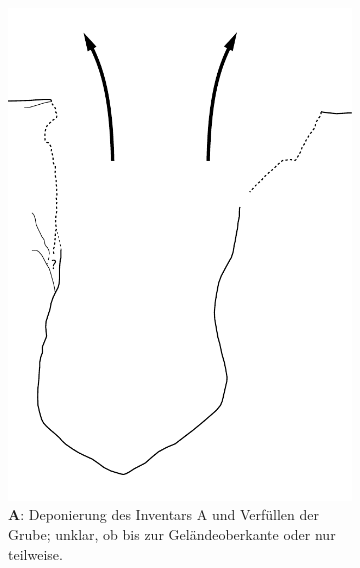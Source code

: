 \begin{figure}[!tb]
\begin{subfigure}[t]{0.32\textwidth}
		\includegraphics[width = \textwidth, page = 2]{fig/MUN87-211_Ablauf.pdf}
		\caption{\textbf{A}: Deponierung des Inventars A und Verfüllen der Grube; unklar, ob bis zur Geländeoberkante oder nur teilweise.}
		\label{fig:MUN87.2-1-1_Sequenz_Skizze_02}
	\end{subfigure}\hspace{2mm}
	\begin{subfigure}[t]{0.32\textwidth}

\end{subfigure}
\end{figure}
